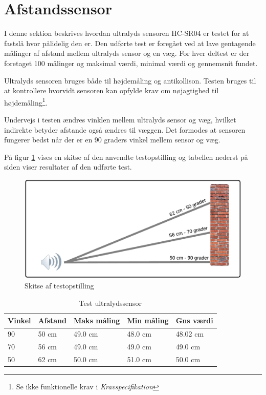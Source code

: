 \section{Afstandssensor}

I denne sektion beskrives hvordan ultralyds sensoren HC-SR04 er testet for at fastslå hvor pålidelig den er. Den udførte test er foregået ved at lave gentagende målinger af afstand mellem ultralyds sensor og en væg. For hver deltest er der foretaget 100 målinger og maksimal værdi, minimal værdi og gennemsnit fundet. 

Ultralyds sensoren bruges både til højdemåling og antikollison. Testen bruges til at kontrollere hvorvidt sensoren kan opfylde krav om nøjagtighed til højdemåling\footnote{Se ikke funktionelle krav i \textit{Kravspecifikation}}. 

Undervejs i testen ændres vinklen mellem ultralyds sensor og væg, hvilket indirekte betyder afstande også ændres til væggen. Det formodes at sensoren fungerer bedst når der er en 90 graders vinkel mellem sensor og væg. 

På figur \ref{fig:ultra_testopstilling} vises en skitse af den anvendte testopstilling og tabellen nederst på siden viser resultater af den udførte test.

\begin{figure}[H]
\centering
\includegraphics[width=1\textwidth]{Billeder/Test/ultrasound.png}
\caption{Skitse af testopstilling}
\label{fig:ultra_testopstilling}
\end{figure}

\vspace{0.5cm}

\begin{table}[H]
\begin{tabular}{| p{2.5cm}| p{2.5cm}| p{2.5cm}| p{2.5cm}| p{2.5cm}|}
\hline
Vinkel & Afstand & Maks måling & Min måling  & Gns værdi \\ \hline
90 & 50 cm & 49.0 cm & 48.0 cm  & 48.02 cm \\ \hline
70 & 56 cm & 49.0 cm & 49.0 cm  & 49.0 cm \\ \hline
50 & 62 cm & 50.0 cm & 51.0 cm  & 50.0 cm \\ \hline

\end{tabular}
\caption{Test ultralydssensor}
\label{tab:Ultralyds_test}
\end{table}


